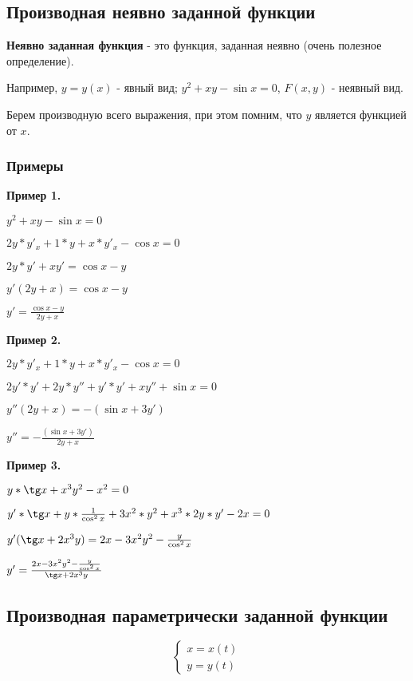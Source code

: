 \documentclass{article}
\begin{document}
\subsection{Производная неявно заданной функции}

\begin{flushleft}

\textbf{Неявно заданная функция} - это функция, заданная неявно (очень полезное определение).

Например, $y = y(x)$ - явный вид; $y^2 + xy - \sin x = 0$, $F(x, y)$ - неявный вид.

\hfill

Берем производную всего выражения, при этом помним, что $y$ является функцией от $x$.

\subsubsection{Примеры}

\parbox{0.5\textwidth}{
\textbf{Пример 1.}

$y^2 + x y - \sin x = 0$

$2y * y'_x + 1 * y + x * y'_x - \cos x = 0$

$2y * y' + x y' = \cos x - y$

$y'(2y + x) = \cos x - y$

$y' = \frac{\cos x - y}{2y + x}$

\bigskip
\textbf{Пример 2.}

$2y * y'_x + 1 * y + x * y'_x - \cos x = 0$

$2y' * y' + 2y * y'' + y' * y' + xy'' + \sin x = 0$

$y''(2y + x) = -(\sin x + 3y')$

$y'' = -\frac{(\sin x + 3y')}{2y + x}$
}
\hfill
\parbox{0.4\textwidth}{
\textbf{Пример 3.}

$y * \tg x + x^3 y^2 - x^2 = 0$

$y' * \tg x + y * \frac{1}{\cos^2 x} + 3x^2 * y^2 + x^3 * 2y * y' - 2x = 0$

$y'(\tg x + 2x^3y) = 2x - 3 x^2 y^2 - \frac{y}{\cos^2 x}$

$y' = \frac{2x - 3 x^2 y^2 - \frac{y}{\cos^2 x}}{\tg x + 2 x^3 y}$
}

\subsection{Производная параметрически заданной функции}

\begin{equation}
    \begin{cases}
        x = x(t) \\
        y = y(t)
    \end{cases}
\end{equation}


\end{flushleft}
\end{document}
